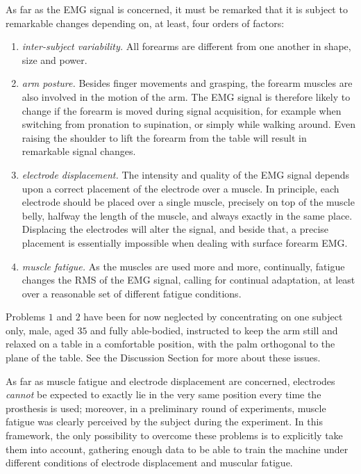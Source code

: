 As far as the EMG signal is concerned, it must be remarked that it is
subject to remarkable changes depending on, at least, four orders of
factors:
\begin{enumerate}

  \item \emph{inter-subject variability.} All forearms are different
    from one another in shape, size and power.

  \item \emph{arm posture.} Besides finger movements and grasping, the
    forearm muscles are also involved in the motion of the arm. The
    EMG signal is therefore likely to change if the forearm is moved
    during signal acquisition, for example when switching from
    pronation to supination, or simply while walking around. Even
    raising the shoulder to lift the forearm from the table will
    result in remarkable signal changes.

  \item \emph{electrode displacement.} The intensity and quality of
    the EMG signal depends upon a correct placement of the electrode
    over a muscle. In principle, each electrode should be placed over
    a single muscle, precisely on top of the muscle belly, halfway the
    length of the muscle, and always exactly in the same place.
    Displacing the electrodes will alter the signal, and beside that,
    a precise placement is essentially impossible when dealing with
    surface forearm EMG.

  \item \emph{muscle fatigue.} As the muscles are used more and more,
    continually, fatigue changes the RMS of the EMG signal, calling
    for continual adaptation, at least over a reasonable set of
    different fatigue conditions.

\end{enumerate}

Problems $1$ and $2$ have been for now neglected by concentrating on
one subject only, male, aged $35$ and fully able-bodied, instructed to
keep the arm still and relaxed on a table in a comfortable position,
with the palm orthogonal to the plane of the table. See the Discussion
Section for more about these issues.

As far as muscle fatigue and electrode displacement are concerned,
electrodes \emph{cannot} be expected to exactly lie in the very same
position every time the prosthesis is used; moreover, in a preliminary
round of experiments, muscle fatigue was clearly perceived by the
subject during the experiment. In this framework, the only possibility
to overcome these problems is to explicitly take them into account,
gathering enough data to be able to train the machine under different
conditions of electrode displacement and muscular fatigue.

